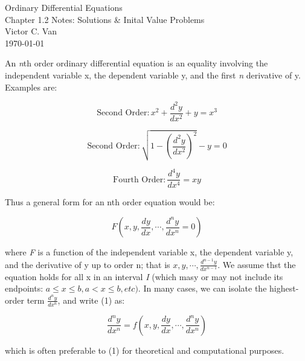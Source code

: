 \documentclass[11pt]{article}
\begin{document}
\begin{titlepage}
    \centering
    \vspace*{\fill} %
    {\Large Ordinary Differential Equations} \\[0.5cm]
    {\Large Chapter 1.2 Notes: Solutions \& Inital Value Problems} \\[0.5cm]
    {\large Victor C. Van} \\[1cm]
    {\today}
    \vspace*{\fill} %
\end{titlepage}

An \textit{n}th order ordinary differential equation is an equality involving the independent variable x,  the dependent variable y, and the first \textit{n} derivative of y.
Examples are:

\[
    \text{Second Order}: x^{2} + \frac{d^{2}y}{dx^{2}} + y = x^{3}
\]

\[
    \text{Second Order}: \sqrt{1- (\frac{d^{2}y}{dx^{2}})^{2}} - y = 0
\]

\[
    \text{Fourth Order}: \frac{d^{4}y}{dx^{4}} = xy
\]

Thus a general form for an nth order equation would be:

\[
    F(x,y, \frac{dy}{dx}, \cdots, \frac{d^{n}y}{dx^{n}} = 0) \tag{1}
\]

where \textit{F} is a function of the independent variable x, the dependent variable y, and the derivative of y up to order n; that is $x,y, \cdots, \frac{d^{n-1}y}{dx^{n-1}}$.
We assume thst the equation holds for all x in an interval \textit{I} (which masy or may not include its endpoints:
$a \leq x \leq b, a < x \leq b, etc).$ In many cases, we can isolate the highest-order term $\frac{d^{n}y}{dx^{n}}$, and write (1) as:

\[
    \frac{d^{n}y}{dx^{n}} = f(x,y, \frac{dy}{dx}, \cdots, \frac{d^{n}y}{dx^{n}}) \tag{2}
\]

which is often preferable to (1) for theoretical and computational purposes.


\end{document}
